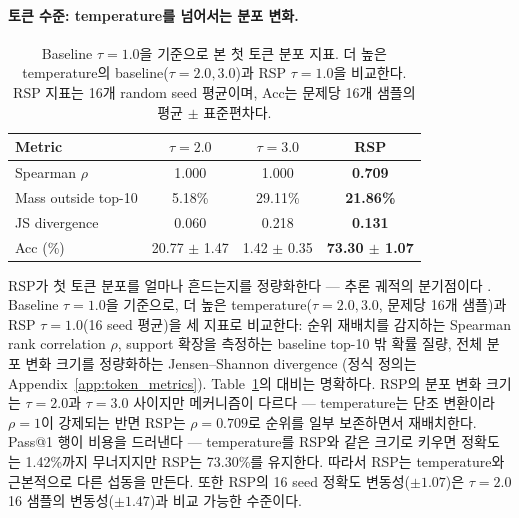 \paragraph{토큰 수준: temperature를 넘어서는 분포 변화.}
\begin{table}
  \vspace{-1.2em}
  \centering
  \caption{Baseline $\tau{=}1.0$을 기준으로 본 첫 토큰 분포 지표. 더 높은 temperature의 baseline($\tau{=}2.0,3.0$)과 RSP $\tau{=}1.0$을 비교한다. RSP 지표는 16개 random seed 평균이며, Acc는 문제당 16개 샘플의 평균 $\pm$ 표준편차다.}
  \label{tab:rsp_vs_temp}
  \footnotesize
  \setlength{\tabcolsep}{3.5pt}
  \renewcommand{\arraystretch}{0.9}
  \begin{tabular}{lccc}
    \toprule
    \textbf{Metric} & \textbf{$\tau{=}2.0$} & \textbf{$\tau{=}3.0$} & \cellcolor{blue!10}\textbf{RSP} \\
    \midrule
    Spearman $\rho$ & 1.000 & 1.000 & \cellcolor{blue!10}\textbf{0.709} \\
    Mass outside top-10 & 5.18\% & 29.11\% & \cellcolor{blue!10}\textbf{21.86\%} \\
    JS divergence & 0.060 & 0.218 & \cellcolor{blue!10}\textbf{0.131} \\
    Acc (\%) & 20.77 $\pm$ 1.47 & 1.42 $\pm$ 0.35 & \cellcolor{blue!10}\textbf{73.30 $\pm$ 1.07} \\
    \bottomrule
  \end{tabular}
\end{table}
RSP가 첫 토큰 분포를 얼마나 흔드는지를 정량화한다 --- 추론 궤적의 분기점이다 \citep{wang2025beyond}. Baseline $\tau{=}1.0$을 기준으로, 더 높은 temperature($\tau{=}2.0,3.0$, 문제당 16개 샘플)과 RSP $\tau{=}1.0$(16 seed 평균)을 세 지표로 비교한다: 순위 재배치를 감지하는 Spearman rank correlation $\rho$, support 확장을 측정하는 baseline top-10 밖 확률 질량, 전체 분포 변화 크기를 정량화하는 Jensen--Shannon divergence (정식 정의는 Appendix~\ref{app:token_metrics}). Table~\ref{tab:rsp_vs_temp}의 대비는 명확하다. RSP의 분포 변화 크기는 $\tau{=}2.0$과 $\tau{=}3.0$ 사이지만 메커니즘이 다르다 --- temperature는 단조 변환이라 $\rho=1$이 강제되는 반면 RSP는 $\rho=0.709$로 순위를 일부 보존하면서 재배치한다. Pass@1 행이 비용을 드러낸다 --- temperature를 RSP와 같은 크기로 키우면 정확도는 1.42\%까지 무너지지만 RSP는 73.30\%를 유지한다. 따라서 RSP는 temperature와 근본적으로 다른 섭동을 만든다. 또한 RSP의 16 seed 정확도 변동성($\pm 1.07$)은 $\tau{=}2.0$ 16 샘플의 변동성($\pm 1.47$)과 비교 가능한 수준이다.


